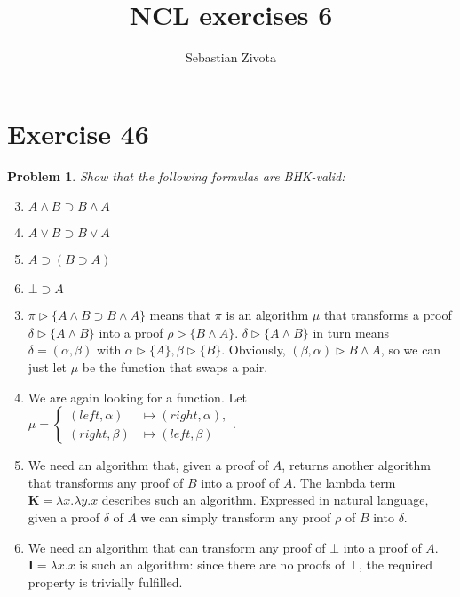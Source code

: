 \documentclass[a4paper,10pt]{article}
\title{NCL exercises 6}
\author{Sebastian Zivota}
\newcommand{\imp}{\supset}
\newtheorem*{problem*}{Problem}
\theoremstyle{definition}
\begin{document}
\maketitle

\section*{Exercise 46}

\begin{problem*}
Show that the following formulas are BHK-valid:

\begin{enumerate}
  \setcounter{enumi}{2}
 \item $A ∧ B \imp B ∧ A$
\item $A ∨ B \imp B ∨ A$
\item $A \imp (B \imp A)$
\item $\bot \imp A$
\end{enumerate}
\end{problem*}
\begin{enumerate}
\setcounter{enumi}{2}
 \item $π \triangleright \{A ∧ B \imp B ∧ A \}$ means that $π$ is an algorithm $μ$ that transforms a proof $δ \triangleright \{A ∧ B\}$ into a proof $ρ \triangleright \{B ∧ A\}$. $δ \triangleright \{A ∧ B\}$ in turn means $δ = (α,β)$ with $α \triangleright \{A\}, β \triangleright \{B\}$. 
 Obviously, $(β,α) \triangleright B ∧ A$, so we can just let $μ$ be the function that swaps a pair.
 \item We are again looking for a function. Let $μ = \begin{cases}
                                                            (left, α)&\mapsto (right,α),\\
                                                            (right,β)&\mapsto (left,β)
                                                           \end{cases}$.
\item We need an algorithm that, given a proof of $A$, returns another algorithm that transforms any proof of $B$ into a proof of $A$. The lambda term $\mathbf{K}=λx.λy.x$ describes such an algorithm. Expressed in natural language,
given a proof $δ$ of $A$ we can simply transform any proof $ρ$ of $B$ into $δ$.
\item We need an algorithm that can transform any proof of $\bot$ into a proof of $A$. $\mathbf{I} = \lambda x.x$ is such an algorithm: since there are no proofs of $\bot$, the required property is trivially fulfilled.
 \end{enumerate}
\end{document}
